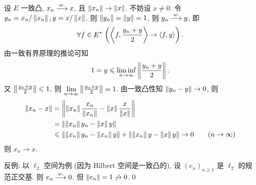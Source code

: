     \begin{Proof}[另证]
        设 $ E $ 一致凸, $ x_{n}\overset{w.}{\longrightarrow} x $, 且 $ \left\| x_{n} \right\|\to\left\| x \right\| $. 不妨设 $ x\ne 0 $. 令 $ y_{n}=x_{n}/\left\| x_{n} \right\|, y=x/\left\| x \right\| $. 则 $ \left\| y_{n} \right\|=\left\| y \right\|=1 $, 则 $ y_{n}\overset{w.}{\longrightarrow} y $, 即
        \[
            \forall f\in E^{*}\,\left( \left\langle f, \frac{y_{n}+y}{2} \right\rangle\to \left\langle f, y \right\rangle \right).
        \]
        由一致有界原理的推论可知
        \[
            1=y\leqslant\liminf_{n\to\infty}\left\| \frac{y_{n}+y}{2} \right\|.
        \]
        又 $ \left\| \frac{y_{n}+y}{2} \right\|\leqslant1 $, 则 $ \lim\limits_{n\to\infty}\left\| \frac{y_{n}+y}{2} \right\|=1 $. 由一致凸性知 $ \left\| y_{n}-y \right\|\to 0 $, 则
        \[
            \begin{aligned}
                \left\| x_{n}-x \right\| & = \left\| \left\| x_{n} \right\|\frac{x_{n}}{\left\| x_{n} \right\|}-\left\| x \right\|\frac{x}{\left\| x \right\|} \right\|\\
                & = \left\| \left\| x_{n} \right\|y_{n}-\left\| x \right\|y \right\|\\
                & \leqslant\left\| \left\| x_{n} \right\|y_{n}-\left\| x_{n} \right\|y \right\|+\left\| \left\| x_{n} \right\|y-\left\| x \right\|y \right\|\to 0\qquad (n\to\infty)
            \end{aligned}
        \]
        则 $ x_{n}\to x $.

        反例: 以 $ \ell_{2} $ 空间为例 (因为 Hilbert 空间是一致凸的), 设 $ (e_{n})_{n\geqslant1} $ 是 $ \ell_{2} $ 的规范正交基. 则 $ e_{n}\overset{w.}{\longrightarrow} 0 $. 但 $ \left\| e_{n} \right\|=1\not\to 0 $.\qed
    \end{Proof}

